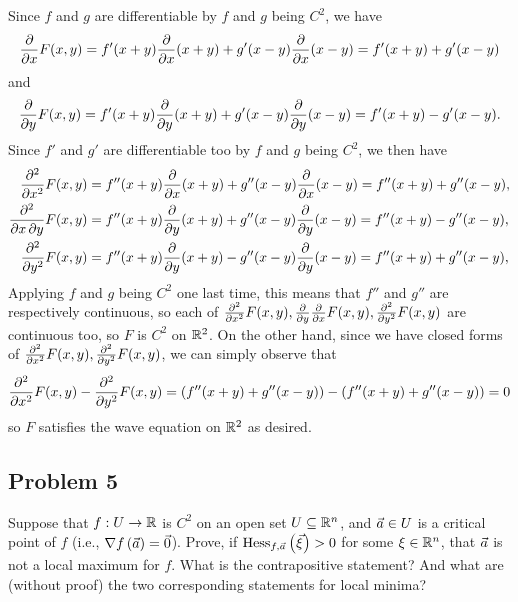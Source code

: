 \documentclass[main.tex]{subfiles}
\begin{document}
\begin{soln}
    Since $f$ and $g$ are differentiable by $f$ and $g$ being $C^2$, we have
    \[\pdv{}{x}F(x, y) = f'(x + y)\pdv{}{x}(x + y) + g'(x - y)\pdv{}{x}(x - y) = f'(x + y) + g'(x - y)\]
    and
    \[\pdv{}{y}F(x, y) = f'(x + y)\pdv{}{y}(x + y) + g'(x - y)\pdv{}{y}(x - y) = f'(x + y) - g'(x - y).\]
    Since $f'$ and $g'$ are differentiable too by $f$ and $g$ being $C^2$, we then have
    \begin{align*}
        \pdv[order = {2}]{}{x}F(x, y) &= f''(x + y)\pdv{}{x}(x + y) + g''(x - y)\pdv{}{x}(x - y) = f''(x + y) + g''(x - y), \\
        \pdv{}{x, y}F(x, y) &= f''(x + y)\pdv{}{y}(x + y) + g''(x - y)\pdv{}{y}(x - y) = f''(x + y) - g''(x - y), \\
        \pdv[order = {2}]{}{y}F(x, y) &= f''(x + y)\pdv{}{y}(x + y) - g''(x - y)\pdv{}{y}(x - y) = f''(x + y) + g''(x - y),
    \end{align*}
    Applying $f$ and $g$ being $C^2$ one last time, this means that $f''$ and $g''$ are respectively continuous, so each of $\pdv[order = {2}]{}{x}F(x, y), \pdv{}{y}\pdv{}{x}F(x, y), \pdv[order = {2}]{}{y}F(x, y)$ are continuous too, so $F$ is $C^2$ on $\mathbb R^2$. On the other hand, since we have closed forms of $\pdv[order = {2}]{}{x}F(x, y), \pdv[order = {2}]{}{y}F(x, y)$, we can simply observe that
    \[\pdv[order = {2}]{}{x}F(x, y) - \pdv[order = {2}]{}{y}F(x, y) = (f''(x + y) + g''(x - y)) - (f''(x + y) + g''(x - y)) = 0\]
    so $F$ satisfies the wave equation on $\mathbb R^2$ as desired.
\end{soln}
\eject

\subsection{Problem 5}
\begin{claim}
    Suppose that $f : U\to \mathbb R$ is $C^2$ on an open set $U \subseteq \mathbb R^n$, and $\vec{a} \in  U$ is a critical point of $f$ (i.e., $\nabla f\left( \vec{a} \right) = \vec{0}$). Prove, if $\operatorname{Hess}_{f, \vec{a}}\left( \vec\xi \right) > 0$ for some $\xi\in \mathbb R^n$, that $\vec{a}$ is not a local maximum for $f$. What is the contrapositive statement? And what are (without proof) the two corresponding statements for local minima?
\end{claim}
\end{document}
